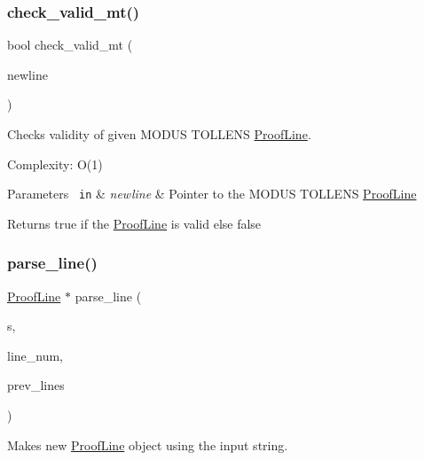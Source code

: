 \subsubsection{\texorpdfstring{check\+\_\+valid\+\_\+mt()}{check\_valid\_mt()}}
{\footnotesize\ttfamily bool check\+\_\+valid\+\_\+mt (\begin{DoxyParamCaption}\item[{\mbox{\hyperlink{classProofLine}{Proof\+Line}} $\ast$}]{newline }\end{DoxyParamCaption})\hspace{0.3cm}{\ttfamily [related]}}



Checks validity of given M\+O\+D\+US T\+O\+L\+L\+E\+NS \mbox{\hyperlink{classProofLine}{Proof\+Line}}. 

Complexity\+: O(1) 
\begin{DoxyParams}[1]{Parameters}
\mbox{\texttt{ in}}  & {\em newline} & Pointer to the M\+O\+D\+US T\+O\+L\+L\+E\+NS \mbox{\hyperlink{classProofLine}{Proof\+Line}} \\
\hline
\end{DoxyParams}
\begin{DoxyReturn}{Returns}
true if the \mbox{\hyperlink{classProofLine}{Proof\+Line}} is valid else false 
\end{DoxyReturn}
\mbox{\label{classProofLine_ab2fe671562f60c3554c37ad75985e036}} 
\subsubsection{\texorpdfstring{parse\+\_\+line()}{parse\_line()}}
{\footnotesize\ttfamily \mbox{\hyperlink{classProofLine}{Proof\+Line}} $\ast$ parse\+\_\+line (\begin{DoxyParamCaption}\item[{std\+::string}]{s,  }\item[{int}]{line\+\_\+num,  }\item[{std\+::vector$<$ \mbox{\hyperlink{classProofLine}{Proof\+Line}} $\ast$ $>$}]{prev\+\_\+lines }\end{DoxyParamCaption})\hspace{0.3cm}{\ttfamily [related]}}



Makes new \mbox{\hyperlink{classProofLine}{Proof\+Line}} object using the input string. 


